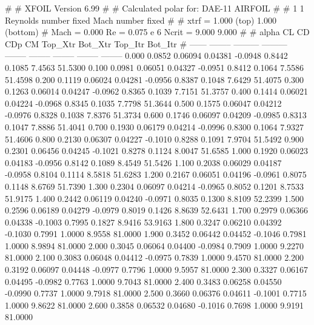 #  
#       XFOIL         Version 6.99
#  
# Calculated polar for: DAE-11 AIRFOIL                                  
#  
# 1 1 Reynolds number fixed          Mach number fixed         
#  
# xtrf =   1.000 (top)        1.000 (bottom)  
# Mach =   0.000     Re =     0.075 e 6     Ncrit =   9.000  9.000
#  
#   alpha    CL        CD       CDp       CM     Top_Xtr  Bot_Xtr  Top_Itr  Bot_Itr
#  ------ -------- --------- --------- -------- -------- -------- -------- --------
   0.000   0.0852   0.06094   0.04381  -0.0948   0.8442   0.1085   7.4563  51.5300
   0.100   0.0981   0.06051   0.04327  -0.0951   0.8412   0.1064   7.5586  51.4598
   0.200   0.1119   0.06024   0.04281  -0.0956   0.8387   0.1048   7.6429  51.4075
   0.300   0.1263   0.06014   0.04247  -0.0962   0.8365   0.1039   7.7151  51.3757
   0.400   0.1414   0.06021   0.04224  -0.0968   0.8345   0.1035   7.7798  51.3644
   0.500   0.1575   0.06047   0.04212  -0.0976   0.8328   0.1038   7.8376  51.3734
   0.600   0.1746   0.06097   0.04209  -0.0985   0.8313   0.1047   7.8886  51.4041
   0.700   0.1930   0.06179   0.04214  -0.0996   0.8300   0.1064   7.9327  51.4606
   0.800   0.2130   0.06307   0.04227  -0.1010   0.8288   0.1091   7.9704  51.5492
   0.900   0.2301   0.06456   0.04245  -0.1021   0.8278   0.1124   8.0047  51.6585
   1.000   0.1920   0.06023   0.04183  -0.0956   0.8142   0.1089   8.4549  51.5426
   1.100   0.2038   0.06029   0.04187  -0.0958   0.8104   0.1114   8.5818  51.6283
   1.200   0.2167   0.06051   0.04196  -0.0961   0.8075   0.1148   8.6769  51.7390
   1.300   0.2304   0.06097   0.04214  -0.0965   0.8052   0.1201   8.7533  51.9175
   1.400   0.2442   0.06119   0.04240  -0.0971   0.8035   0.1300   8.8109  52.2399
   1.500   0.2596   0.06189   0.04279  -0.0979   0.8019   0.1426   8.8639  52.6431
   1.700   0.2979   0.06366   0.04338  -0.1003   0.7995   0.1827   8.9416  53.9163
   1.800   0.3247   0.06210   0.04392  -0.1030   0.7991   1.0000   8.9558  81.0000
   1.900   0.3452   0.06442   0.04452  -0.1046   0.7981   1.0000   8.9894  81.0000
   2.000   0.3045   0.06064   0.04400  -0.0984   0.7909   1.0000   9.2270  81.0000
   2.100   0.3083   0.06048   0.04412  -0.0975   0.7839   1.0000   9.4570  81.0000
   2.200   0.3192   0.06097   0.04448  -0.0977   0.7796   1.0000   9.5957  81.0000
   2.300   0.3327   0.06167   0.04495  -0.0982   0.7763   1.0000   9.7043  81.0000
   2.400   0.3483   0.06258   0.04550  -0.0990   0.7737   1.0000   9.7918  81.0000
   2.500   0.3660   0.06376   0.04611  -0.1001   0.7715   1.0000   9.8622  81.0000
   2.600   0.3858   0.06532   0.04680  -0.1016   0.7698   1.0000   9.9191  81.0000
